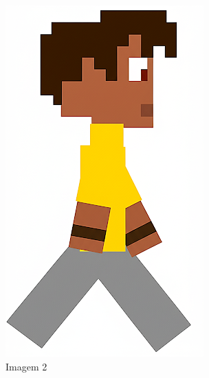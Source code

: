 \begin{figure}[htbp]
    \begin{subfigure}{0.23\linewidth}
        \includegraphics[width=1\linewidth]{figs/geminiPro/chat10/tela1_res2_2.PNG}
        \caption{\small Imagem 2}
        \label{fig:geminiProSheet5_2b}
    \end{subfigure}
    \begin{subfigure}{0.23\linewidth}

\end{subfigure}
\end{figure}
